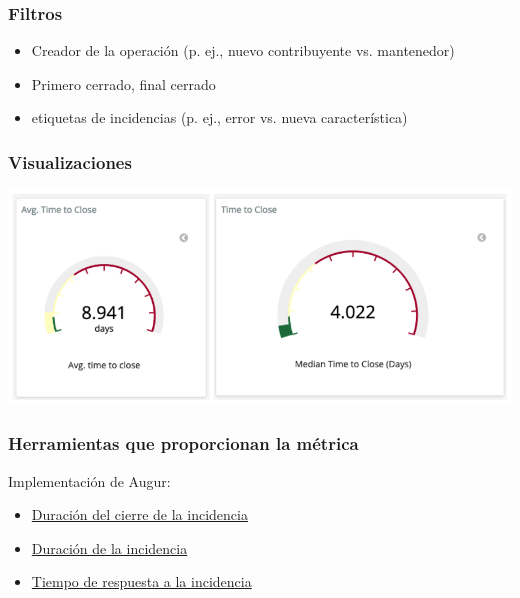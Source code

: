 \hypertarget{filtros}{%
\subsubsection{Filtros}\label{filtros}}

\begin{itemize}
\tightlist
\item
  Creador de la operación (p. ej., nuevo contribuyente vs. mantenedor)
\item
  Primero cerrado, final cerrado
\item
  etiquetas de incidencias (p. ej., error vs. nueva característica)
\end{itemize}

\hypertarget{visualizaciones}{%
\subsubsection{Visualizaciones}\label{visualizaciones}}

\includegraphics{images/time-to-close_1.png}

\hypertarget{herramientas-que-proporcionan-la-muxe9trica}{%
\subsubsection{Herramientas que proporcionan la
métrica}\label{herramientas-que-proporcionan-la-muxe9trica}}

Implementación de Augur:

\begin{itemize}
\tightlist
\item
  \href{http://augur.osshealth.io/api_docs/\#api-Evolution-Closed_Issue_Resolution_Duration(Repo)}{Duración
  del cierre de la incidencia}
\item
  \href{http://augur.osshealth.io/api_docs/\#api-Evolution-issue-duration-repo}{Duración
  de la incidencia}
\item
  \href{http://augur.osshealth.io/api_docs/\#api-Evolution-Issue_Response_Time(Repo)}{Tiempo
  de respuesta a la incidencia}
\end{itemize}

